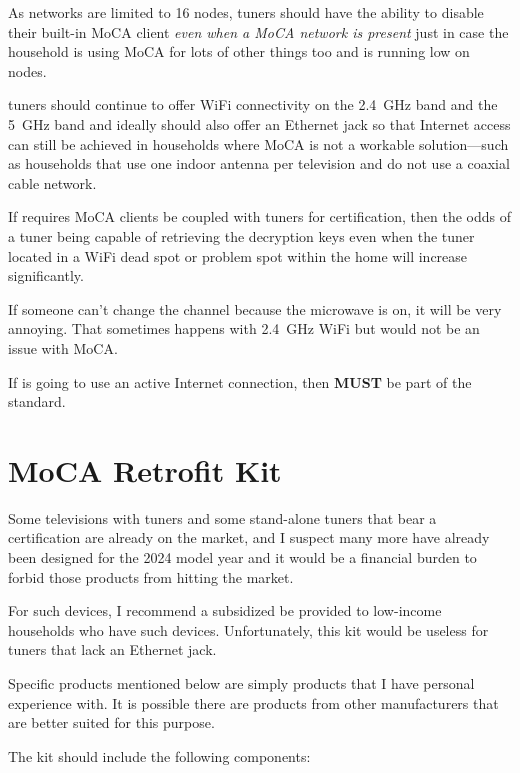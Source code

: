 As  networks are limited to 16 nodes,  tuners should have the ability to
disable their built-in MoCA client \emph{even when a MoCA network is present} just in case
the household is using MoCA for lots of other things too and is running low on nodes.

\ngtv{} tuners should continue to offer WiFi connectivity on the \SI{2.4}{\giga\hertz} band
and the \SI{5}{\giga\hertz} band and ideally should also offer an Ethernet jack so that
Internet access can still be achieved in households where MoCA is not a workable solution---such
as households that use one indoor antenna per television and do not use a coaxial cable network.

If \ngtv{} requires MoCA clients be coupled with  tuners for certification, then the
odds of a tuner being capable of retrieving the decryption keys even when the tuner located in
a WiFi dead spot or problem spot within the home will increase significantly.

If someone can't change the channel because the microwave is on, it will be very annoying. That
sometimes happens with \SI{2.4}{\giga\hertz} WiFi but would not be an issue with MoCA.

If \ngtv{} is going to use an active Internet connection, then \xdband{} \textbf{MUST} be part
of the \ngtv{} standard.


\section{MoCA Retrofit Kit}

Some televisions with  tuners and some stand-alone  tuners that bear
a \ngtv{} certification are already on the market, and I suspect many more have
already been designed for the 2024 model year and it would be a financial burden to
forbid those products from hitting the market.

For such devices, I recommend a subsidized  be provided to
low-income households who have such devices. Unfortunately, this kit would be
useless for  tuners that lack an Ethernet jack.

Specific products mentioned below are simply products that I have personal experience with.
It is possible there are products from other manufacturers that are better suited for this
purpose.

The kit should include the following components:

